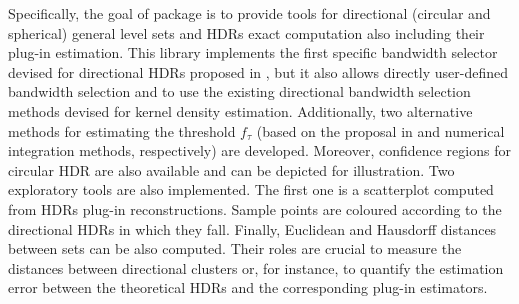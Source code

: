 Specifically, the goal of  package is to provide tools for directional (circular and spherical) general level sets and HDRs exact computation also including their plug-in estimation. This library implements the first specific bandwidth selector devised for directional HDRs proposed in \cite{saavedra2020nonparametric}, but it also allows directly user-defined bandwidth selection and to use the existing directional bandwidth selection methods devised for kernel density estimation. Additionally, two alternative methods for estimating the threshold $f_\tau$ (based on the proposal in \citealp{hyndman1996computing} and numerical integration methods, respectively) are developed. Moreover, confidence regions for circular HDR are also available and can be depicted for illustration. Two exploratory tools are also implemented. The first one is a scatterplot computed from HDRs plug-in reconstructions. Sample points are coloured according to the directional HDRs in which they fall. Finally, Euclidean and Hausdorff distances between sets can be also computed. Their roles are crucial to measure the distances between directional clusters or, for instance, to quantify the estimation error between the theoretical HDRs and the corresponding plug-in estimators.




